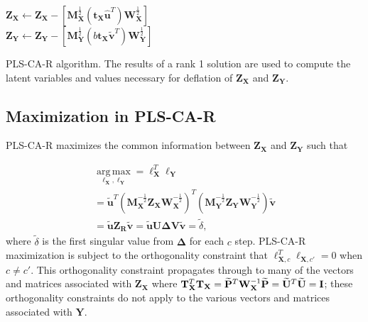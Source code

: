 \documentclass[12pt]{article}
\begin{document}
\begin{algorithm}
{  ${\mathbf Z}_{{\mathbf X}} \leftarrow {\mathbf Z}_{{\mathbf X}} - [{\mathbf M}_{\mathbf X}^{\frac{1}{2}}({\mathbf t}_{\mathbf X}\widehat{\mathbf u}^{T}){\mathbf W}_{\mathbf X}^{\frac{1}{2}}]$\\
  ${\mathbf Z}_{{\mathbf Y}} \leftarrow {\mathbf Z}_{{\mathbf Y}} - [{\mathbf M}_{\mathbf Y}^{\frac{1}{2}}(b{\mathbf t}_{\mathbf X}\widetilde{\mathbf{v}}^{T}){\mathbf W}_{\mathbf Y}^{\frac{1}{2}}]$
}
\caption{PLS-CA-R algorithm. The results of a rank 1 solution are used to compute the latent variables and values necessary for deflation of ${\mathbf Z}_{{\mathbf X}}$ and ${\mathbf Z}_{{\mathbf Y}}$.}
\label{algo:plscar}
\end{algorithm}

\hypertarget{maximization-in-pls-ca-r}{%
\subsection{Maximization in PLS-CA-R}\label{maximization-in-pls-ca-r}}

PLS-CA-R maximizes the common information between
\({\mathbf Z}_{\mathbf X}\) and \({\mathbf Z}_{\mathbf Y}\) such that

\begin{equation}
\begin{aligned}
\underset{{\boldsymbol \ell}_{\mathbf X},{\boldsymbol \ell}_{\mathbf Y}}{\operatorname{arg\,max}} = {\boldsymbol \ell}_{\mathbf X}^{T}{\boldsymbol \ell}_{\mathbf Y} \\ 
= \widetilde{\mathbf u}^{T}({\mathbf M}_{\mathbf X}^{-\frac{1}{2}}{\mathbf Z}_{\mathbf X}{\mathbf W}_{\mathbf X}^{-\frac{1}{2}})^{T}({\mathbf M}_{\mathbf Y}^{-\frac{1}{2}}{\mathbf Z}_{\mathbf Y}{\mathbf W}_{\mathbf Y}^{-\frac{1}{2}})\widetilde{\mathbf v} \\ 
= \widetilde{\mathbf u}{\mathbf Z}_{\mathbf R}\widetilde{\mathbf v} = \widetilde{\mathbf u}{\mathbf U}{\boldsymbol \Delta}{\mathbf V}\widetilde{\mathbf v} = \widetilde\delta,
\end{aligned}
\end{equation} where \(\widetilde\delta\) is the first singular value
from \({\mathbf \Delta}\) for each \(c\) step. PLS-CA-R maximization is
subject to the orthogonality constraint that
\({\boldsymbol \ell}_{{\mathbf X},c}^{T}{\boldsymbol \ell}_{{\mathbf X},c'} = 0\)
when \(c \neq c'\). This orthogonality constraint propagates through to
many of the vectors and matrices associated with
\({\mathbf Z}_{\mathbf X}\) where
\({\mathbf T}_{\mathbf X}^{T}{\mathbf T}_{\mathbf X} = \widetilde{\mathbf P}^{T}{\mathbf W}_{\bf X}^{-1}\widetilde{\mathbf P} = \widetilde{\mathbf U}^{T}\widetilde{\mathbf U} = {\mathbf I}\);
these orthogonality constraints do not apply to the various vectors and
matrices associated with \({\mathbf Y}\).
\end{document}
